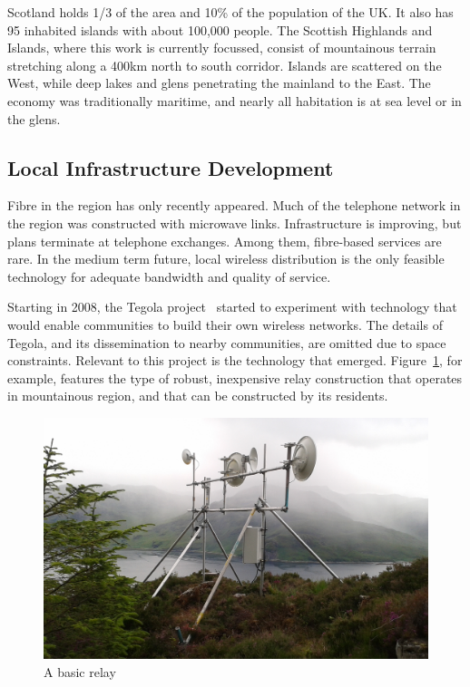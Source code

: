 
Scotland holds 1/3 of the area and 10\% of the population of the UK.
It also has 95 inhabited islands with about 100,000 people. The
Scottish Highlands and Islands, where this work is currently focussed,
consist of mountainous terrain stretching along a 400km north to south
corridor. Islands are scattered on the West, while deep lakes and
glens penetrating the mainland to the East.  The economy was
traditionally maritime, and nearly all habitation is at sea level or
in the glens.

\subsection{Local Infrastructure Development}

Fibre in the region has only recently appeared.  Much of the telephone
network in the region was constructed with microwave links.
Infrastructure is improving, but plans terminate at telephone
exchanges. Among them, fibre-based services are rare. In the medium
term future, local wireless distribution is the only feasible
technology for adequate bandwidth and quality of service.

Starting in 2008, the Tegola project~\cite{tegola} started to
experiment with technology that would enable communities to build
their own wireless networks.
The details of Tegola, and its dissemination to nearby communities,
are omitted due to space constraints. Relevant to this project is the
technology that emerged. Figure~\ref{fig:mhialairigh}, for example,
features the type of robust, inexpensive relay construction that
operates in mountainous region, and that can be constructed by its
residents.

\begin{figure}[h]
\centering
 \includegraphics[width=0.7\columnwidth]{figs/mhialairigh-from-behind}
 \caption{A basic relay}
\label{fig:mhialairigh}
\end{figure}

